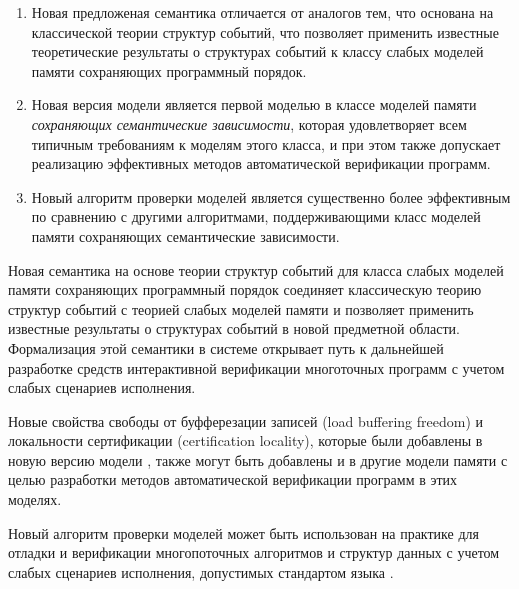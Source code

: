 {\novelty}
\begin{enumerate}[beginpenalty=10000] %

  \item Новая предложеная семантика отличается от аналогов тем, 
    что основана на классической теории структур событий, 
    что позволяет применить известные теоретические результаты 
    о структурах событий к классу слабых моделей памяти сохраняющих программный порядок.

  \item Новая версия модели \WkmS является первой моделью в классе 
    моделей памяти \emph{сохраняющих семантические зависимости}, 
    которая удовлетворяет всем типичным требованиям к моделям этого класса, 
    и при этом также допускает реализацию эффективных методов автоматической верификации программ. 

  \item Новый алгоритм проверки моделей является существенно более эффективным 
    по сравнению с другими алгоритмами, поддерживающими 
    класс моделей памяти сохраняющих семантические зависимости.

\end{enumerate}

{\influence} 

Новая семантика на основе теории структур событий 
для класса слабых моделей памяти сохраняющих программный порядок
соединяет классическую теорию структур событий 
с теорией слабых моделей памяти и позволяет применить известные результаты 
о структурах событий в новой предметной области.  
Формализация этой семантики в системе \coq открывает 
путь к дальнейшей разработке средств 
интерактивной верификации многоточных программ  
с учетом слабых сценариев исполнения. 
 
Новые свойства свободы от буфферезации записей (load buffering freedom)
и локальности сертификации (certification locality), 
которые были добавлены в новую версию модели \WkmS, 
также могут быть добавлены и в другие модели памяти 
с целью разработки методов автоматической верификации программ в этих моделях. 

Новый алгоритм проверки моделей может быть использован на практике
для отладки и верификации многопоточных алгоритмов и структур данных 
с учетом слабых сценариев исполнения, допустимых стандартом языка \CLANG. 

